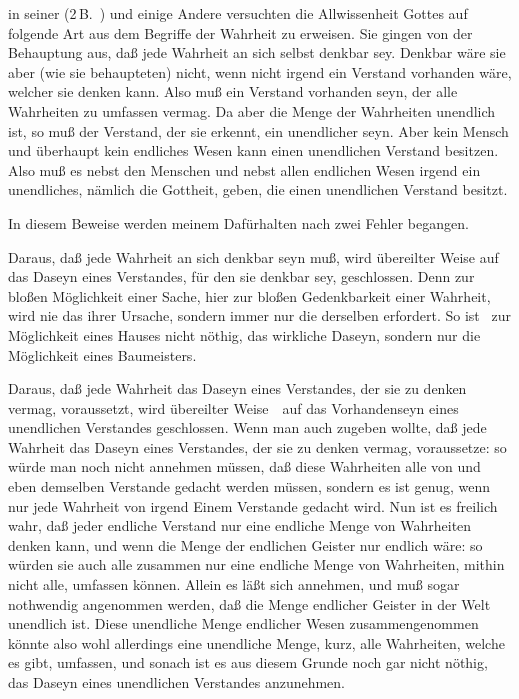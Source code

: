 \begin{RWanm} 
 in seiner  (2\,B.\ ) und einige Andere versuchten die Allwissenheit Gottes auf folgende Art aus dem Begriffe der Wahrheit zu erweisen. Sie gingen von der Behauptung aus, daß jede Wahrheit an sich selbst denkbar sey. Denkbar wäre sie aber (wie sie behaupteten) nicht, wenn nicht irgend ein Verstand vorhanden wäre, welcher sie denken kann. Also muß ein Verstand vorhanden seyn, der alle Wahrheiten zu umfassen vermag. Da aber die Menge der Wahrheiten unendlich ist, so muß der Verstand, der sie erkennt, ein unendlicher seyn. Aber kein Mensch und überhaupt kein endliches Wesen kann einen unendlichen Verstand besitzen. Also muß es nebst den Menschen und nebst allen endlichen Wesen irgend ein unendliches, nämlich die Gottheit, geben, die einen unendlichen Verstand besitzt.\par
In diesem Beweise werden meinem Dafürhalten nach zwei Fehler begangen.
\begin{aufza}
\item Daraus, daß jede Wahrheit an sich denkbar seyn muß, wird übereilter Weise auf das Daseyn eines Verstandes, für den sie denkbar sey, geschlossen. Denn zur bloßen Möglichkeit einer Sache, hier zur bloßen Gedenkbarkeit einer Wahrheit, wird nie das  ihrer Ursache, sondern immer nur die  derselben erfordert. So ist \zB\ zur Möglichkeit eines Hauses nicht nöthig, das wirkliche Daseyn, sondern nur die Möglichkeit eines Baumeisters.
\item Daraus, daß jede Wahrheit das Daseyn eines Verstandes, der sie zu denken vermag, voraussetzt, wird übereilter Weise~\ auf das Vorhandenseyn eines unendlichen Verstandes geschlossen. Wenn man auch zugeben wollte, daß jede Wahrheit das Daseyn eines Verstandes, der sie zu denken vermag, voraussetze: so würde man noch nicht annehmen müssen, daß diese Wahrheiten alle von  und eben demselben Verstande gedacht werden müssen, sondern es ist genug, wenn nur jede Wahrheit von irgend Einem Verstande gedacht wird. Nun ist es freilich wahr, daß jeder endliche Verstand nur eine endliche Menge von Wahrheiten denken kann, und wenn die Menge der endlichen Geister nur endlich wäre: so würden sie auch alle zusammen nur eine endliche Menge von Wahrheiten, mithin nicht alle, umfassen können. Allein es läßt sich annehmen, und muß sogar nothwendig angenommen werden, daß die Menge endlicher Geister in der Welt unendlich ist. Diese unendliche Menge endlicher Wesen zusammengenommen könnte also wohl allerdings eine unendliche Menge, kurz, alle Wahrheiten, welche es gibt, umfassen, und sonach ist es aus diesem Grunde noch gar nicht nöthig, das Daseyn eines unendlichen Verstandes anzunehmen.

\end{aufza}
\end{RWanm}
